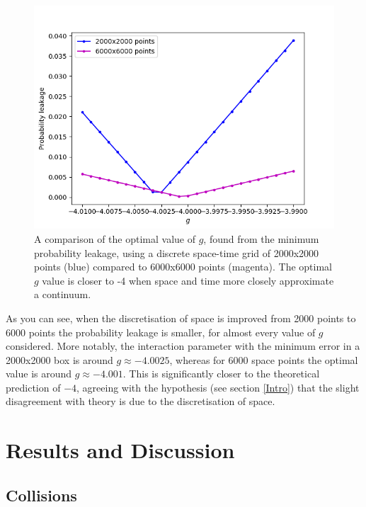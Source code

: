 \documentclass[10pt, twocolumn]{revtex4}    %
\begin{document}
\begin{figure}[h] 
\includegraphics[width=\columnwidth]{errors.png}
\caption{A comparison of the optimal value of $g$, found from the minimum probability leakage, using a discrete space-time grid of 2000x2000 points (blue) compared to 6000x6000 points (magenta). The optimal $g$ value is closer to -4 when space and time more closely approximate a continuum.}
\label{errorsfig}
\end{figure}

As you can see, when the discretisation of space is improved from 2000 points to 6000 points the probability leakage is smaller, for almost every value of $g$ considered. More notably, the interaction parameter with the minimum error in a 2000x2000 box is around $g \approx -4.0025$, whereas for 6000 space points the optimal value is around $g \approx -4.001$. This is significantly closer to the theoretical prediction of $-4$, agreeing with the hypothesis (see section \ref{Intro}) that the slight disagreement with theory is due to the discretisation of space.



\section{Results and Discussion} \label{Results}


\subsection{Collisions}
\end{document}
